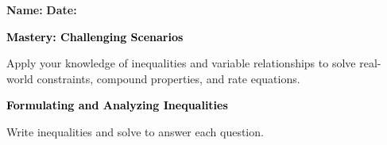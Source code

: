 \documentclass[12pt, letterpaper, fleqn]{article}
\begin{document}
\textbf{Name:} \underline{\hspace{5cm}}
\hfill
\textbf{Date:} \underline{\hspace{3cm}}\\

\begin{tcolorbox}[colback=black!10]
    \large\textcolor{black}{\textbf{Mastery: Challenging Scenarios}}
\end{tcolorbox}

\vspace{3mm}
\noindent
Apply your knowledge of inequalities and variable relationships to solve real-world constraints, compound properties, and rate equations.

\vspace{4mm}

\begin{tcolorbox}[colback=black!10]
\large\textcolor{black}{\textbf{Formulating and Analyzing Inequalities}}
\end{tcolorbox}

\noindent
Write inequalities and solve to answer each question.

\vspace{3mm}
\end{document}
